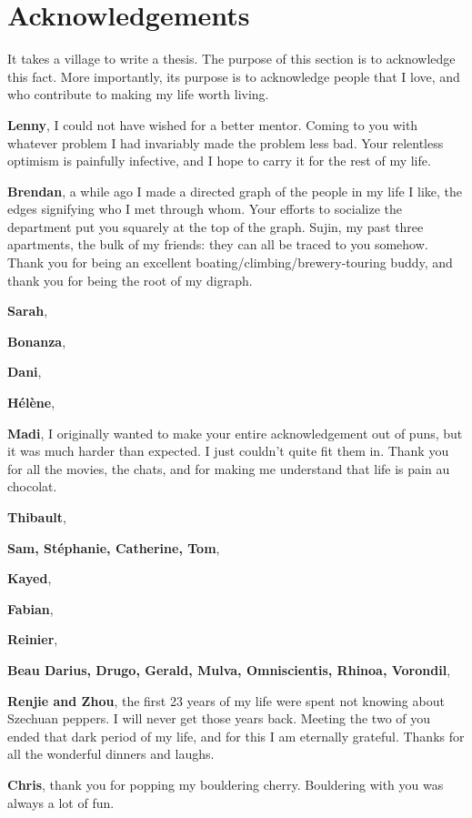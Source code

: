 \chapter*{Acknowledgements}
It takes a village to write a thesis. The purpose of this section is to acknowledge this fact. More importantly, its purpose is to acknowledge people that I love, and who contribute to making my life worth living.

{\bfseries Lenny}, I could not have wished for a better mentor. Coming to you with whatever problem I had invariably made the problem less bad. Your relentless optimism is painfully infective, and I hope to carry it for the rest of my life.

{\bfseries Brendan}, a while ago I made a directed graph of the people in my life I like, the edges signifying who I met through whom. Your efforts to socialize the department put you squarely at the top of the graph. Sujin, my past three apartments, the bulk of my friends: they can all be traced to you somehow. Thank you for being an excellent boating/climbing/brewery-touring buddy, and thank you for being the root of my digraph.

{\bfseries Sarah},

{\bfseries Bonanza},

{\bfseries Dani},

{\bfseries H\'el\`ene},

{\bfseries Madi}, I originally wanted to make your entire acknowledgement out of puns, but it was much harder than expected. I just couldn't quite fit them in. Thank you for all the movies, the chats, and for making me understand that life is pain au chocolat.

{\bfseries Thibault},



{\bfseries Sam, St\'ephanie, Catherine, Tom},


{\bfseries Kayed},

{\bfseries Fabian},

{\bfseries Reinier},


{\bfseries Beau Darius, Drugo, Gerald, Mulva, Omniscientis, Rhinoa, Vorondil},


{\bfseries Renjie and Zhou}, the first 23 years of my life were spent not knowing about Szechuan peppers. I will never get those years back. Meeting the two of you ended that dark period of my life, and for this I am eternally grateful. Thanks for all the wonderful dinners and laughs.


{\bfseries Chris}, thank you for popping my bouldering cherry. Bouldering with you was always a lot of fun.


